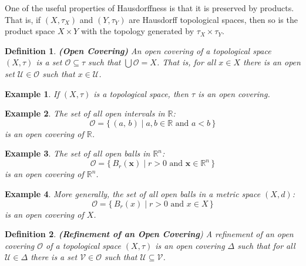 \documentclass{article}
\theoremstyle{plain}
\theoremstyle{normal}
\newtheorem{definition}{Definition}[section]
\newtheorem{example}{Example}[section]
\begin{document}
        One of the useful properties of Hausdorffness is that it is preserved
        by products. That is, if $(X,\tau_{X})$ and $(Y,\tau_{Y})$ are
        Hausdorff topological spaces, then so is the product space
        $X\times{Y}$ with the topology generated by $\tau_{X}\times\tau_{Y}$.
        \begin{definition}{\textbf{(Open Covering)}}
            An open covering of a topological space $(X,\tau)$ is a set
            $\mathcal{O}\subseteq\tau$ such that $\bigcup\mathcal{O}=X$. That
            is, for all $x\in{X}$ there is an open set
            $\mathcal{U}\in\mathcal{O}$ such that $x\in\mathcal{U}$.
        \end{definition}
        \begin{example}
            If $(X,\tau)$ is a topological space, then $\tau$ is an open
            covering.
        \end{example}
        \begin{example}
            The set of all open intervals in $\mathbb{R}$:
            \begin{equation}
                \mathcal{O}=
                    \{\,(a,\,b)\;|\;a,b\in\mathbb{R}\textrm{ and }a<b\,\}
            \end{equation}
            is an open covering of $\mathbb{R}$.
        \end{example}
        \begin{example}
            The set of all open balls in $\mathbb{R}^{n}$:
            \begin{equation}
                \mathcal{O}=
                    \{\,B_{r}(\mathbf{x})\;|\;
                        r>0\textrm{ and }\mathbf{x}\in\mathbb{R}^{n}\,\}
            \end{equation}
            is an open covering of $\mathbb{R}^{n}$.
        \end{example}
        \begin{example}
            More generally, the set of all open balls in a metric space $(X,d)$:
            \begin{equation}
                \mathcal{O}=
                    \{\,B_{r}(x)\;|\;r>0\textrm{ and }x\in{X}\,\}
            \end{equation}
            is an open covering of $X$.
        \end{example}
        \begin{definition}{\textbf{(Refinement of an Open Covering})}
            A refinement of an open covering $\mathcal{O}$ of a topological
            space $(X,\tau)$ is an open covering $\Delta$ such that for all
            $\mathcal{U}\in\Delta$ there is a set $\mathcal{V}\in\mathcal{O}$
            such that $\mathcal{U}\subseteq\mathcal{V}$.
        \end{definition}
\end{document}
